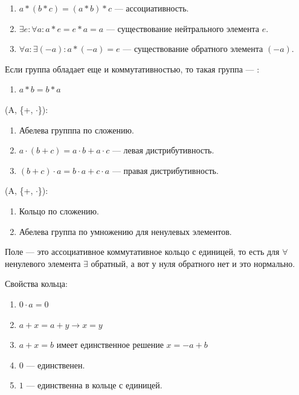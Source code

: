 \begin{enumerate}
    \item $a * (b * c) = (a * b) * c$ --- ассоциативность.
    \item $\exists e:\forall a: a * e = e * a = a$ --- существование нейтрального элемента $e$.
    \item $\forall a: \exists (-a): a* (-a) = e$ --- существование обратного элемента $(-a)$.
\end{enumerate}

Если группа обладает еще и коммутативностью, то такая группа --- :

\begin{enumerate}[resume]
    \item $a * b = b * a$
\end{enumerate}

 (A, \{+, $\cdot$\}):

\begin{enumerate}
    \item[1--4.] Абелева групппа по сложению.
    \setcounter{enumi}{4}
    \item $a \cdot (b+c) = a\cdot b + a\cdot c$ --- левая дистрибутивность.
    \item $(b+c)\cdot a  = b \cdot a + c \cdot a$  --- правая дистрибутивность.
\end{enumerate}

  (A, \{+, $\cdot$\}):
\begin{enumerate}
    \item[1--5.] Кольцо по сложению.
    \item[6--9.] Абелева группа по умножению для ненулевых элементов.
\end{enumerate}

Поле --- это ассоциативное коммутативное кольцо с единицей, то есть для $\forall$ ненулевого элемента $\exists$ обратный, а вот у нуля обратного нет и это нормально.

Свойства кольца:

\begin{enumerate}
    \item $0 \cdot a = 0$
    \item $a+x = a+ y \rightarrow x=y$
    \item $a + x = b$ имеет единственное решение $x = -a + b$
    \item $0$ --- единственен.
    \item $1$ --- единственна в кольце с единицей.
\end{enumerate}

